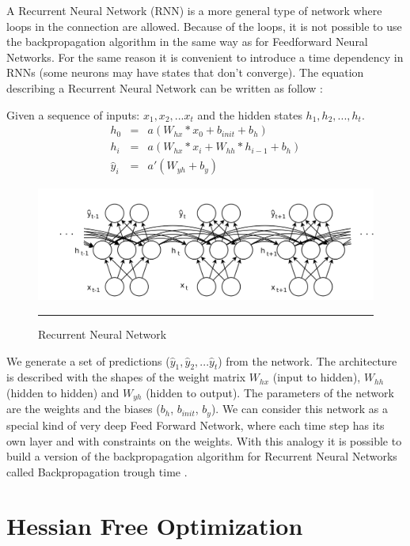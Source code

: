 A Recurrent Neural Network (RNN) is a more general type of network where loops in the connection are allowed. Because of the loops, it is not possible to use the backpropagation algorithm in the same way as for Feedforward Neural Networks. For the same reason it is convenient to introduce a time dependency in RNNs (some neurons may have states that don't converge). The equation describing a Recurrent Neural Network can be written as follow : 


Given a sequence of inputs: $x_1, x_2, ... x_t$ and the hidden states $h_1, h_2, ..., h_t$.
$$
\begin{array}{rcr} 
    h_0 & = & a(W_{hx}  * x_0 + b_{init} + b_h)  \\ 
    h_i & = & a(W_{hx}  * x_i + W _{hh} * h_{i-1} + b_h)  \\ 
    \hat{y}_i & = & a'(W_{yh} + b_y)

\end{array}
$$

\begin{figure}[htbp]
    \centering
    \includegraphics[scale=0.3]{Figures/RNN.png}
    \rule{35em}{0.5pt}
    \caption[Recurrent Neural Network]{Recurrent Neural Network}
    \label{fig:rnn}
\end{figure}




We generate a set of predictions ($\hat{y}_1, \hat{y}_2, ... \hat{y}_t$) from the network. The architecture is described with the shapes of the weight matrix $W_{hx}$ (input to hidden), $W_{hh}$ (hidden to hidden) and $W_{yh}$ (hidden to output). The parameters of the network are the weights and the biases ($b_h$, $b_{init}$, $b_y$).
We can consider this network as a special kind of very deep Feed Forward Network, where each time step has its own layer and with constraints on the weights. With this analogy it is possible to build a version of the backpropagation algorithm for Recurrent Neural Networks called Backpropagation trough time \cite{werbos1990backpropagation}.


\section{Hessian Free Optimization}

